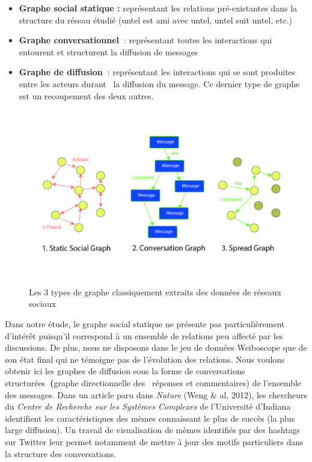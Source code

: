 \begin{itemize}
\item \textbf{Graphe social statique : }repr\'esentant les relations
pr\'e-existantes dans la structure du r\'eseau \'etudi\'e (untel est
ami avec untel, untel suit untel, etc.)
\item \textbf{Graphe conversationnel~}: repr\'esentant toutes les
interactions qui entourent et structurent la diffusion de messages 
\item \textbf{Graphe de diffusion~}: repr\'esentant les interactions qui
se sont produites entre les acteurs durant \ la diffusion du message.
Ce dernier type de graphe est un recoupement des deux autres.
\end{itemize}


\begin{figure}
    \includegraphics[width=6.2894in,height=3.0004in]{figures/chap3/chapitre3-img9.jpg}
    \caption[3 modèles de réseau]{Les 3 types de graphe classiquement extraits des donn\'ees de r\'eseaux sociaux}
\end{figure}



Dans notre \'etude, le graphe social statique ne pr\'esente pas
particuli\`erement d{\textquoteright}int\'er\^et
puisqu{\textquoteright}il correspond \`a un ensemble de relations peu
affect\'e par les discussions. De plus, nous ne disposons dans le jeu
de donn\'ees Weiboscope que de son \'etat final qui ne t\'emoigne pas
de l{\textquoteright}\'evolution des relations. Nous voulons obtenir
ici les graphes de diffusion sous la forme de conversations
structur\'ees\textbf{~(}graphe directionnelle des \ r\'eponses et
commentaires) de l{\textquoteright}ensemble des messages. Dans un
article paru dans \textit{Nature }(Weng \& al, 2012), les chercheurs du
\textit{Centre de Recherche sur les Syst\`emes Complexes} de
l{\textquoteright}Universit\'e d{\textquoteright}Indiana identifient
les caract\'eristiques des m\`emes connaissant le plus de succ\`es (la
plus large diffusion). Un travail de visualisation de m\`emes
identifi\'es par des hashtags sur Twitter leur permet notamment de
mettre \`a jour des motifs particuliers dans la structure des
conversations.



